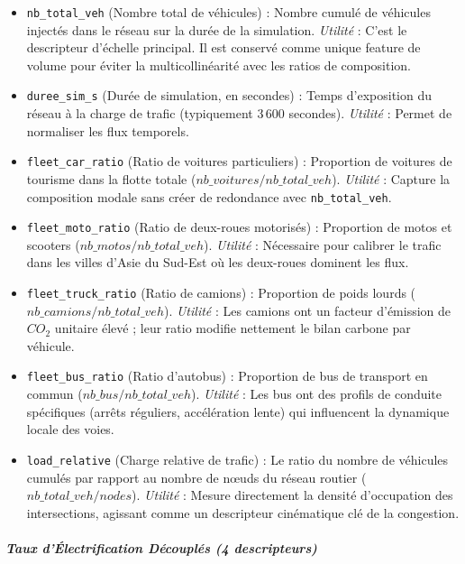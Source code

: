 \documentclass[10pt, a4paper]{article}
\providecommand{\tightlist}{}
\begin{document}
\begin{itemize}
\tightlist
\item
  \texttt{nb\_total\_veh} (Nombre total de véhicules) : Nombre cumulé de
  véhicules injectés dans le réseau sur la durée de la simulation.
  \emph{Utilité} : C'est le descripteur d'échelle principal. Il est
  conservé comme unique feature de volume pour éviter la
  multicollinéarité avec les ratios de composition.
\item
  \texttt{duree\_sim\_s} (Durée de simulation, en secondes) : Temps
  d'exposition du réseau à la charge de trafic (typiquement 3\,600
  secondes). \emph{Utilité} : Permet de normaliser les flux temporels.
\item
  \texttt{fleet\_car\_ratio} (Ratio de voitures particuliers) :
  Proportion de voitures de tourisme dans la flotte totale
  (\(nb\_voitures / nb\_total\_veh\)). \emph{Utilité} : Capture la
  composition modale sans créer de redondance avec
  \texttt{nb\_total\_veh}.
\item
  \texttt{fleet\_moto\_ratio} (Ratio de deux-roues motorisés) :
  Proportion de motos et scooters (\(nb\_motos / nb\_total\_veh\)).
  \emph{Utilité} : Nécessaire pour calibrer le trafic dans les villes
  d'Asie du Sud-Est où les deux-roues dominent les flux.
\item
  \texttt{fleet\_truck\_ratio} (Ratio de camions) : Proportion de poids
  lourds (\(nb\_camions / nb\_total\_veh\)). \emph{Utilité} : Les
  camions ont un facteur d'émission de \(CO_2\) unitaire élevé ; leur
  ratio modifie nettement le bilan carbone par véhicule.
\item
  \texttt{fleet\_bus\_ratio} (Ratio d'autobus) : Proportion de bus de
  transport en commun (\(nb\_bus / nb\_total\_veh\)). \emph{Utilité} :
  Les bus ont des profils de conduite spécifiques (arrêts réguliers,
  accélération lente) qui influencent la dynamique locale des voies.
\item
  \texttt{load\_relative} (Charge relative de trafic) : Le ratio du
  nombre de véhicules cumulés par rapport au nombre de nœuds du réseau
  routier (\(nb\_total\_veh / nodes\)). \emph{Utilité} : Mesure
  directement la densité d'occupation des intersections, agissant comme
  un descripteur cinématique clé de la congestion.
\end{itemize}

\subparagraph{Taux d'Électrification Découplés (4
descripteurs)}\label{taux-duxe9lectrification-duxe9coupluxe9s-4-descripteurs-1}
\end{document}

